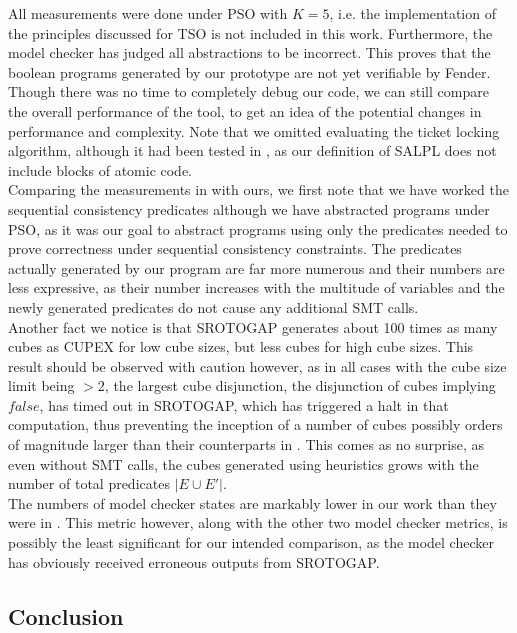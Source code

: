 All measurements were done under PSO with $K = 5$, i.e. the implementation of the principles discussed for TSO is not included in this work. Furthermore, the model checker has judged all abstractions to be incorrect. This proves that the boolean programs generated by our prototype are not yet verifiable by Fender. Though there was no time to completely debug our code, we can still compare the overall performance of the tool, to get an idea of the potential changes in performance and complexity. Note that we omitted evaluating the ticket locking algorithm, although it had been tested in \cite{danetal13}, as our definition of SALPL does not include blocks of atomic code.\\

Comparing the measurements in \cite{danetal13} with ours, we first note that we have worked the sequential consistency predicates although we have abstracted programs under PSO, as it was our goal to abstract programs using only the predicates needed to prove correctness under sequential consistency constraints. The predicates actually generated by our program are far more numerous and their numbers are less expressive, as their number increases with the multitude of variables and the newly generated predicates do not cause any additional SMT calls.\\

Another fact we notice is that SROTOGAP generates about 100 times as many cubes as CUPEX \cite{danetal13} for low cube sizes, but less cubes for high cube sizes. This result should be observed with caution however, as in all cases with the cube size limit being $> 2$, the largest cube disjunction, the disjunction of cubes implying $false$, has timed out in SROTOGAP, which has triggered a halt in that computation, thus preventing the inception of a number of cubes possibly orders of magnitude larger than their counterparts in . This comes as no surprise, as even without SMT calls, the cubes generated using heuristics grows with the number of total predicates $|E \cup E'|$.\\

The numbers of model checker states are markably lower in our work than they were in \cite{danetal13}. This metric however, along with the other two model checker metrics, is possibly the least significant for our intended comparison, as the model checker has obviously received erroneous outputs from SROTOGAP.

\subsection{Conclusion}

